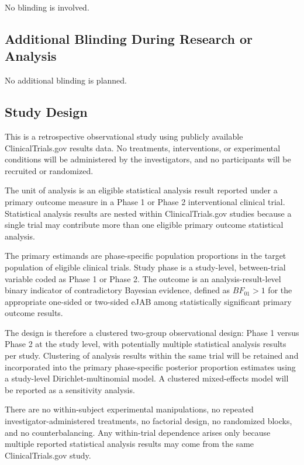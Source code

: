 \documentclass[11pt]{article}
\begin{document}
No blinding is involved.

\subsection{Additional Blinding During Research or Analysis}

No additional blinding is planned.

\subsection{Study Design}

This is a retrospective observational study using publicly available ClinicalTrials.gov results data. No treatments, interventions, or experimental conditions will be administered by the investigators, and no participants will be recruited or randomized.

The unit of analysis is an eligible statistical analysis result reported under a primary outcome measure in a Phase 1 or Phase 2 interventional clinical trial. Statistical analysis results are nested within ClinicalTrials.gov studies because a single trial may contribute more than one eligible primary outcome statistical analysis.

The primary estimands are phase-specific population proportions in the target population of eligible clinical trials. Study phase is a study-level, between-trial variable coded as Phase 1 or Phase 2. The outcome is an analysis-result-level binary indicator of contradictory Bayesian evidence, defined as \(BF_{01} > 1\) for the appropriate one-sided or two-sided eJAB among statistically significant primary outcome results.

The design is therefore a clustered two-group observational design: Phase 1 versus Phase 2 at the study level, with potentially multiple statistical analysis results per study. Clustering of analysis results within the same trial will be retained and incorporated into the primary phase-specific posterior proportion estimates using a study-level Dirichlet-multinomial model. A clustered mixed-effects model will be reported as a sensitivity analysis.

There are no within-subject experimental manipulations, no repeated investigator-administered treatments, no factorial design, no randomized blocks, and no counterbalancing. Any within-trial dependence arises only because multiple reported statistical analysis results may come from the same ClinicalTrials.gov study.
\end{document}
